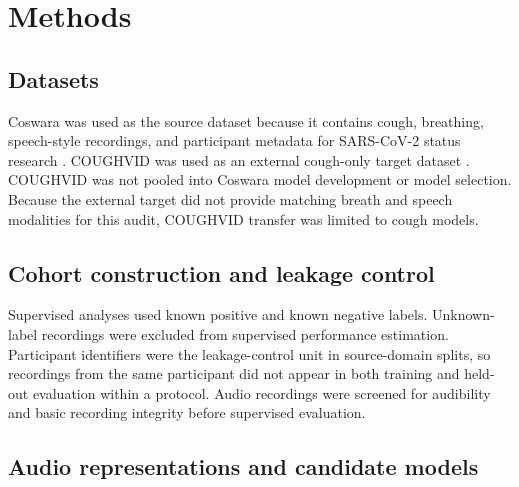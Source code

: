 \documentclass[11pt]{article}
\begin{document}
\section*{Methods}

\subsection*{Datasets}

Coswara was used as the source dataset because it contains cough, breathing, speech-style recordings, and participant metadata for SARS-CoV-2 status research \citep{bhattacharya2023coswara}. COUGHVID was used as an external cough-only target dataset \citep{orlandic2021coughvid}. COUGHVID was not pooled into Coswara model development or model selection. Because the external target did not provide matching breath and speech modalities for this audit, COUGHVID transfer was limited to cough models.

\subsection*{Cohort construction and leakage control}

Supervised analyses used known positive and known negative labels. Unknown-label recordings were excluded from supervised performance estimation. Participant identifiers were the leakage-control unit in source-domain splits, so recordings from the same participant did not appear in both training and held-out evaluation within a protocol. Audio recordings were screened for audibility and basic recording integrity before supervised evaluation.

\subsection*{Audio representations and candidate models}
\end{document}

